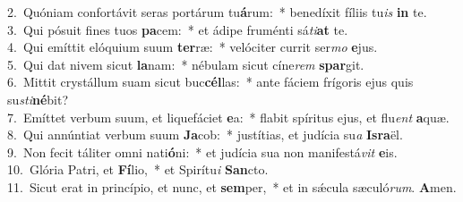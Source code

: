 {2.~}Quóniam confortávit seras portárum tu\textbf{á}rum:~* benedíxit fíliis tu\textit{is} \textbf{in} te.\\
{3.~}Qui pósuit fines tuos \textbf{pa}cem:~* et ádipe fruménti sá\textit{ti}\textbf{at} te.\\
{4.~}Qui emíttit elóquium suum \textbf{ter}ræ:~* velóciter currit ser\textit{mo} \textbf{e}jus.\\
{5.~}Qui dat nivem sicut \textbf{la}nam:~* nébulam sicut cíne\textit{rem} \textbf{spar}git.\\
{6.~}Mittit crystállum suam sicut buc\textbf{cél}las:~* ante fáciem frígoris ejus quis su\textit{sti}\textbf{né}bit?\\
{7.~}Emíttet verbum suum, et liquefáciet \textbf{e}a:~* flabit spíritus ejus, et flu\textit{ent} \textbf{a}quæ.\\
{8.~}Qui annúntiat verbum suum \textbf{Ja}cob:~* justítias, et judícia su\textit{a} \textbf{Is}\textbf{ra}ël.\\
{9.~}Non fecit táliter omni nati\textbf{ó}ni:~* et judícia sua non manifestá\textit{vit} \textbf{e}is.\\
{10.~}Glória Patri, et \textbf{Fí}lio,~* et Spirítu\textit{i} \textbf{San}cto.\\
{11.~}Sicut erat in princípio, et nunc, et \textbf{sem}per,~* et in sǽcula sæculó\textit{rum}. \textbf{A}men.\\
